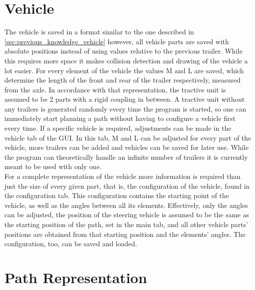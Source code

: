 \section{Vehicle}
\label{sec:vehicle}

The vehicle is saved in a format similar to the one described in \ref{sec:previous_knowledge_vehicle} however, all vehicle parts are saved with absolute positions instead of using values relative to the previous trailer. While this requires more space it makes collision detection and drawing of the vehicle a lot easier. For every element of the vehicle the values M and L are saved, which determine the length of the front and rear of the trailer respectively, measured from the axle. In accordance with that representation, the tractive unit is assumed to be 2 parts with a rigid coupling in between. A tractive unit without any trailers is generated randomly every time the program is started, so one can immediately start planning a path without having to configure a vehicle first every time. If a specific vehicle is required, adjustments can be made in the vehicle tab of the GUI. In this tab, M and L can be adjusted for every part of the vehicle, more trailers can be added and vehicles can be saved for later use. While the program can theoretically handle an infinite number of trailers it is currently meant to be used with only one.\\
For a complete representation of the vehicle more information is required than just the size of every given part, that is, the configuration of the vehicle, found in the configuration tab. This configuration contains the starting point of the vehicle, as well as the angles between all its elements. Effectively, only the angles can be adjusted, the position of the steering vehicle is assumed to be the same as the starting position of the path, set in the main tab, and all other vehicle parts' positions are obtained from that starting position and the elements' angles. The configuration, too, can be saved and loaded.

\section{Path Representation}
\label{sec:path_representation}


